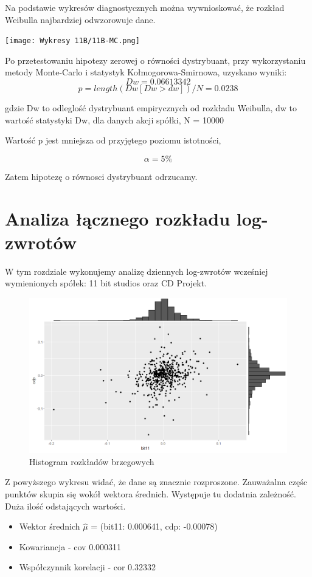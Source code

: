 \documentclass[a4paper,11pt]{article}
\def\\{\hfill\break}
\begin{document}
Na podstawie wykresów diagnostycznych można wywnioskować, że rozkład Weibulla najbardziej odwzorowuje dane.



\newpage
\centerline{\texttt{[image: Wykresy 11B/11B-MC.png]}}

Po przetestowaniu hipotezy zerowej o równości dystrybuant, przy wykorzystaniu metody Monte-Carlo i statystyk Kołmogorowa-Smirnowa, uzyskano wyniki:
  $$ Dw = 0.06613342 $$
  $$p = length(Dw[Dw>dw])/N = 0.0238$$ 

gdzie Dw to odleglość dystrybuant empirycznych od rozkładu Weibulla, dw to wartość statystyki Dw, dla danych akcji spółki, N = 10000

\\
Wartość p jest mniejsza od przyjętego poziomu istotności,

   $$ \alpha  = 5\%$$

Zatem hipotezę o równosci dystrybuant odrzucamy.





\newpage


\section{Analiza łącznego rozkładu log-zwrotów}
W tym rozdziale wykonujemy analizę dziennych log-zwrotów wcześniej wymienionych spółek: 11 bit studios oraz CD Projekt. 
\begin{figure}[H]
    \includegraphics[width=13cm]{Wykresy/Histogram_rozkladow_brzegowych.png}
    \caption{Histogram rozkładów brzegowych}
    \label{fig:mlp}
\end{figure}
Z powyższego wykresu widać, że dane są znacznie rozproszone. Zauważalna częśc punktów skupia się wokół wektora średnich. Występuje tu dodatnia zależność. Duża ilość odstających wartości.
\begin{itemize}
  \item Wektor średnich $\hat{\mu}$ = (bit11: 0.000641, cdp: -0.00078)
  \item Kowariancja - cov 0.000311
  \item Współczynnik korelacji - cor 0.32332
\end{itemize} 
\end{document}
